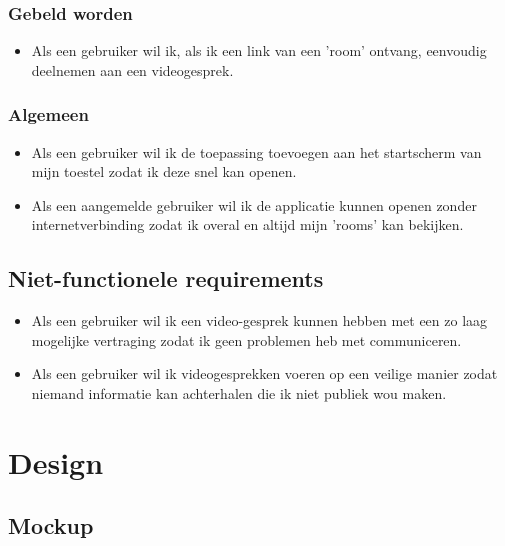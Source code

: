 	 	\subsubsection{Gebeld worden}
	 	 \begin{itemize}
				\item Als een gebruiker wil ik, als ik een link van een 'room' ontvang, eenvoudig deelnemen aan een videogesprek.
	 	 \end{itemize}
	
		\subsubsection{Algemeen}
	 		\begin{itemize}
	 			\item Als een gebruiker wil ik de toepassing toevoegen aan het startscherm van mijn toestel zodat ik deze snel kan openen.
	 			\item Als een aangemelde gebruiker wil ik de applicatie kunnen openen zonder internetverbinding zodat ik overal en altijd mijn 'rooms' kan bekijken.
			\end{itemize}
	 
	\subsection{Niet-functionele requirements}
		\begin{itemize}
			\item Als een gebruiker wil ik een video-gesprek kunnen hebben met een zo laag mogelijke vertraging zodat ik geen problemen heb met communiceren.
			\item Als een gebruiker wil ik videogesprekken voeren op een veilige manier zodat niemand informatie kan achterhalen die ik niet publiek wou maken.
		\end{itemize} 
		

\newpage
\section{Design}
		\subsection{Mockup}
					
